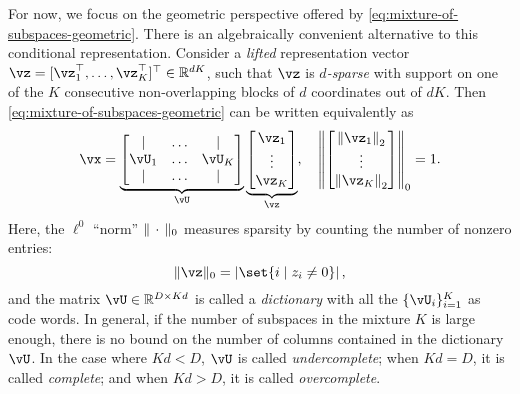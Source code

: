 \documentclass[../../book-main.tex]{subfiles}
\begin{document}
For now, we focus on the geometric perspective offered by \eqref{eq:mixture-of-subspaces-geometric}.
There is an algebraically convenient alternative to this conditional representation. Consider a \textit{lifted} representation vector $\vz = [\vz_1^\top, \dots, \vz_K^\top]^\top \in \R^{dK}$, such that $\vz$ is \textit{$d$-sparse} with support on one of the $K$ consecutive non-overlapping blocks of $d$ coordinates out of $dK$. 
Then \eqref{eq:mixture-of-subspaces-geometric} can be written equivalently as
\begin{equation}\label{eq:mixture-of-subspaces-dictionary-pre}
    \vx = 
    \underbrace{
    \begin{bmatrix} 
    | & \hdots & |  \\
    \vU_1 & \hdots & \vU_K  \\
    | & \hdots & | 
    \end{bmatrix} 
    }_{\vU}
    \underbrace{
    \begin{bmatrix} \vz_1 \\ \vdots \\ \vz_K \end{bmatrix}
    }_{\vz},
    \quad
    \norm*{
    \begin{bmatrix} \norm*{\vz_1}_2 \\ \vdots \\ \norm*{\vz_K}_2 \end{bmatrix}
    }_0 = 1.
\end{equation}
Here, the $\ell^0$ ``norm'' $\norm{\,\cdot\,}_0$ measures sparsity by counting the number of nonzero entries:
\begin{equation}\label{eq:ell-zero-norm}
    \norm{\vz}_0 = \abs*{\set{i \given z_i \neq 0}},
\end{equation}
and the matrix $\vU \in \R^{D \times Kd}$ is called a \textit{dictionary} with all the $\{\vU_i\}_{i=1}^K$ as code words. In general, if the number of subspaces in the mixture $K$ is large enough, there is no bound on the number of columns contained in the dictionary $\vU$. In the case where $Kd < D$, $\vU$ is called \textit{undercomplete};
when $Kd = D$, it is called \textit{complete}; and when $Kd > D$, it is called \textit{overcomplete}. 
\end{document}
